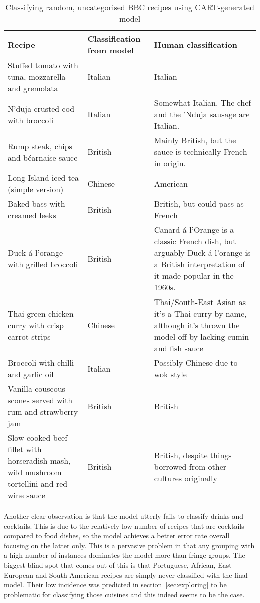 \documentclass[11pt,a4paper]{article}
\begin{document}
\begin{sidewaystable}
  \centering
  \begin{tabular}{| p{9cm} | p{3cm} | p{9cm} |}
    \hline
    \textbf{Recipe} & \textbf{Classification from model} & \textbf{Human classification} \\
    \hline
    Stuffed tomato with tuna, mozzarella and gremolata & Italian & Italian \\
    \hline
    N’duja-crusted cod with broccoli & Italian & Somewhat Italian. The chef and the 'Nduja sausage are Italian. \\
    \hline
    Rump steak, chips and béarnaise sauce & British & Mainly British, but the sauce is technically French in origin. \\
    \hline
    Long Island iced tea (simple version) & Chinese & American \\
    \hline
    Baked bass with creamed leeks & British & British, but could pass as French \\
    \hline
    Duck \'a l'orange with grilled broccoli & British & Canard \'a l'Orange is a classic French dish, but arguably Duck \'a l'orange is a British interpretation of it made popular in the 1960s. \cite{hestonsfeasts} \\
    \hline
    Thai green chicken curry with crisp carrot strips & Chinese & Thai/South-East Asian as it's a Thai curry by name, although it's thrown the model off by lacking cumin and fish sauce \\
    \hline
    Broccoli with chilli and garlic oil & Italian & Possibly Chinese due to wok style \\
    \hline
    Vanilla couscous scones served with rum and strawberry jam & British & British \\
    \hline
    Slow-cooked beef fillet with horseradish mash, wild mushroom tortellini and red wine sauce & British & British, despite things borrowed from other cultures originally \\
    \hline
  \end{tabular}
  \caption{Classifying random, uncategorised BBC recipes using CART-generated model}
  \label{tab:evaluation}
\end{sidewaystable}

Another clear observation is that the model utterly fails to classify drinks and cocktails.
This is due to the relatively low number of recipes that are cocktails compared
to food dishes, so the model achieves a better error rate overall focusing on the latter
only. This is a pervasive problem in that any grouping with a high number of instances
dominates the model more than fringe groups. The biggest blind spot that comes out
of this is that Portuguese, African, East European and South American recipes are simply
never classified with the final model. Their low incidence was predicted in
section~\ref{sec:exploring} to be problematic for classifying those cuisines and this
indeed seems to be the case.
\end{document}

